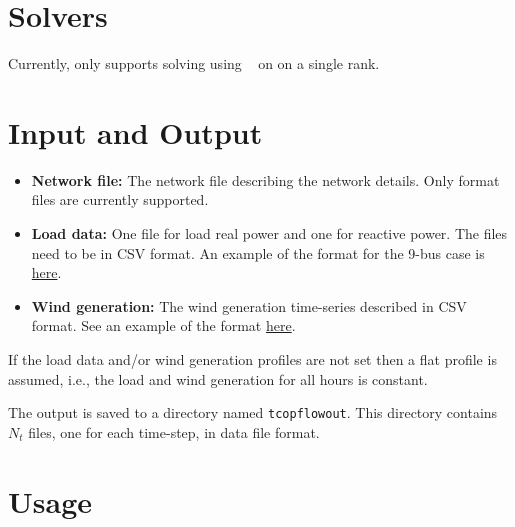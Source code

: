 \section{Solvers}\label{sec:tcopflow_solvers}%
Currently, \exago only supports solving \tcopflow using \ipopt~ on on a single rank. %

\section{Input and Output}
\begin{itemize}
    \item \textbf{Network file:} The network file describing the network details. Only \matpower format files are currently supported.
    \item \textbf{Load data:} One file for load real power and one for reactive power. The files need to be in CSV format. An example of the format for the 9-bus case is \href{https://gitlab.pnnl.gov/exasgd/frameworks/exago/-/tree/master/datafiles/case9}{here}.
    \item \textbf{Wind generation:} The wind generation time-series described in CSV format. See an example of the format \href{https://gitlab.pnnl.gov/exasgd/frameworks/exago/-/tree/master/datafiles/case9}{here}.
\end{itemize}
If the load data and/or wind generation profiles are not set then a flat profile is assumed, i.e., the load and wind generation for all hours is constant.

The \tcopflow output is saved to a directory named \texttt{tcopflowout}. This directory contains $N_t$ files, one for each time-step, in \matpower data file format.

\section{Usage}
\begin{lstlisting}

\end{lstlisting}

